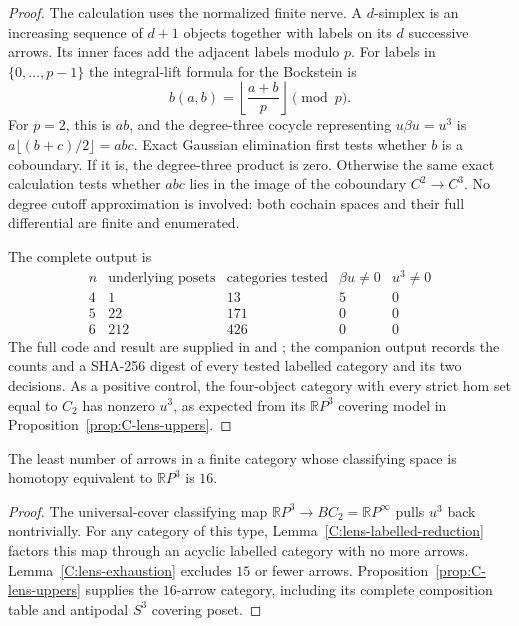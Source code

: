 \begin{proof}
The calculation uses the normalized finite nerve. A $d$-simplex is an
increasing sequence of $d+1$ objects together with labels on its $d$
successive arrows. Its inner faces add the adjacent labels modulo $p$.
For labels in $\{0,\ldots,p-1\}$ the integral-lift formula for the
Bockstein is
\[
 b(a,b)=\left\lfloor\frac{a+b}{p}\right\rfloor\pmod p.
\]
For $p=2$, this is $ab$, and the degree-three cocycle representing
$u\beta u=u^3$ is $a\lfloor(b+c)/2\rfloor=abc$.
Exact Gaussian elimination first tests whether $b$ is a coboundary.
If it is, the degree-three product is zero. Otherwise the same exact
calculation tests whether $abc$ lies in the image of the coboundary
$C^2\to C^3$. No degree cutoff approximation is involved: both
cochain spaces and their full differential are finite and enumerated.

The complete output is
\[
\begin{array}{c|r|r|r|r}
 n&\text{underlying posets}&\text{categories tested}
   &\beta u\ne0&u^3\ne0\\\hline
 4&1&13&5&0\\
 5&22&171&0&0\\
 6&212&426&0&0
\end{array}
\]
The full code and result are supplied in
 and
; the companion output records
the counts and a SHA-256 digest of every tested labelled category and
its two decisions. As a positive control, the four-object category
with every strict hom set equal to $C_2$ has nonzero $u^3$, as expected
from its $\mathbb RP^3$ covering model in
Proposition~\ref{prop:C-lens-uppers}.
\end{proof}

\begin{theorem}
\label{C:RP3-minimum}
The least number of arrows in a finite category whose classifying space
is homotopy equivalent to $\mathbb RP^3$ is $16$.
\end{theorem}
\begin{proof}
The universal-cover classifying map
$\mathbb RP^3\to BC_2=\mathbb RP^\infty$ pulls $u^3$ back nontrivially.
For any category of this type, Lemma~\ref{C:lens-labelled-reduction}
factors this map through an acyclic labelled category with no more
arrows. Lemma~\ref{C:lens-exhaustion} excludes $15$ or fewer arrows.
Proposition~\ref{prop:C-lens-uppers} supplies the $16$-arrow category,
including its complete composition table and antipodal $S^3$ covering
poset.
\end{proof}

